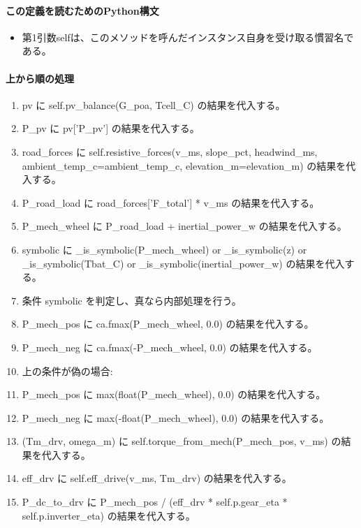 \documentclass[a4paper,11pt]{article}
\begin{document}
            \paragraph{この定義を読むためのPython構文}
            \begin{itemize}[leftmargin=1.6em]
            \item 第1引数selfは、このメソッドを呼んだインスタンス自身を受け取る慣習名である。
            \end{itemize}
            \paragraph{上から順の処理}
            \begin{enumerate}[leftmargin=1.8em]
            \item pv に self.pv\_balance(G\_poa, Tcell\_C) の結果を代入する。
\item P\_pv に pv['P\_pv'] の結果を代入する。
\item road\_forces に self.resistive\_forces(v\_ms, slope\_pct, headwind\_ms, ambient\_temp\_c=ambient\_temp\_c, elevation\_m=elevation\_m) の結果を代入する。
\item P\_road\_load に road\_forces['F\_total'] * v\_ms の結果を代入する。
\item P\_mech\_wheel に P\_road\_load + inertial\_power\_w の結果を代入する。
\item symbolic に \_is\_symbolic(P\_mech\_wheel) or \_is\_symbolic(z) or \_is\_symbolic(Tbat\_C) or \_is\_symbolic(inertial\_power\_w) の結果を代入する。
\item 条件 symbolic を判定し、真なら内部処理を行う。
\item   P\_mech\_pos に ca.fmax(P\_mech\_wheel, 0.0) の結果を代入する。
\item   P\_mech\_neg に ca.fmax(-P\_mech\_wheel, 0.0) の結果を代入する。
\item   上の条件が偽の場合:
\item   P\_mech\_pos に max(float(P\_mech\_wheel), 0.0) の結果を代入する。
\item   P\_mech\_neg に max(-float(P\_mech\_wheel), 0.0) の結果を代入する。
\item (Tm\_drv, omega\_m) に self.torque\_from\_mech(P\_mech\_pos, v\_ms) の結果を代入する。
\item eff\_drv に self.eff\_drive(v\_ms, Tm\_drv) の結果を代入する。
\item P\_dc\_to\_drv に P\_mech\_pos / (eff\_drv * self.p.gear\_eta * self.p.inverter\_eta) の結果を代入する。

\end{enumerate}
\end{document}
